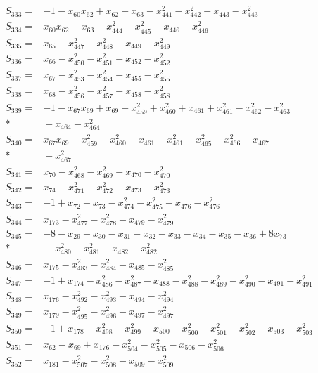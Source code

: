 \begin{align*}
S_{333}={}&-1-x_{60}x_{62}+x_{62}+x_{63}-x_{441}^{2}-x_{442}^{2}-x_{443}-x_{443}^{2}\\[3pt]
S_{334}={}&x_{60}x_{62}-x_{63}-x_{444}^{2}-x_{445}^{2}-x_{446}-x_{446}^{2}\\[3pt]
S_{335}={}&x_{65}-x_{447}^{2}-x_{448}^{2}-x_{449}-x_{449}^{2}\\[3pt]
S_{336}={}&x_{66}-x_{450}^{2}-x_{451}^{2}-x_{452}-x_{452}^{2}\\[3pt]
S_{337}={}&x_{67}-x_{453}^{2}-x_{454}^{2}-x_{455}-x_{455}^{2}\\[3pt]
S_{338}={}&x_{68}-x_{456}^{2}-x_{457}^{2}-x_{458}-x_{458}^{2}\\[3pt]
S_{339}={}&-1-x_{67}x_{69}+x_{69}+x_{459}^{2}+x_{460}^{2}+x_{461}+x_{461}^{2}-x_{462}^{2}-x_{463}^{2}\\*
&{}-x_{464}-x_{464}^{2}\\[3pt]
S_{340}={}&x_{67}x_{69}-x_{459}^{2}-x_{460}^{2}-x_{461}-x_{461}^{2}-x_{465}^{2}-x_{466}^{2}-x_{467}\\*
&{}-x_{467}^{2}\\[3pt]
S_{341}={}&x_{70}-x_{468}^{2}-x_{469}^{2}-x_{470}-x_{470}^{2}\\[3pt]
S_{342}={}&x_{74}-x_{471}^{2}-x_{472}^{2}-x_{473}-x_{473}^{2}\\[3pt]
S_{343}={}&-1+x_{72}-x_{73}-x_{474}^{2}-x_{475}^{2}-x_{476}-x_{476}^{2}\\[3pt]
S_{344}={}&x_{173}-x_{477}^{2}-x_{478}^{2}-x_{479}-x_{479}^{2}\\[3pt]
S_{345}={}&-8-x_{29}-x_{30}-x_{31}-x_{32}-x_{33}-x_{34}-x_{35}-x_{36}+8x_{73}\\*
&{}-x_{480}^{2}-x_{481}^{2}-x_{482}-x_{482}^{2}\\[3pt]
S_{346}={}&x_{175}-x_{483}^{2}-x_{484}^{2}-x_{485}-x_{485}^{2}\\[3pt]
S_{347}={}&-1+x_{174}-x_{486}^{2}-x_{487}^{2}-x_{488}-x_{488}^{2}-x_{489}^{2}-x_{490}^{2}-x_{491}-x_{491}^{2}\\[3pt]
S_{348}={}&x_{176}-x_{492}^{2}-x_{493}^{2}-x_{494}-x_{494}^{2}\\[3pt]
S_{349}={}&x_{179}-x_{495}^{2}-x_{496}^{2}-x_{497}-x_{497}^{2}\\[3pt]
S_{350}={}&-1+x_{178}-x_{498}^{2}-x_{499}^{2}-x_{500}-x_{500}^{2}-x_{501}^{2}-x_{502}^{2}-x_{503}-x_{503}^{2}\\[3pt]
S_{351}={}&x_{62}-x_{69}+x_{176}-x_{504}^{2}-x_{505}^{2}-x_{506}-x_{506}^{2}\\[3pt]
S_{352}={}&x_{181}-x_{507}^{2}-x_{508}^{2}-x_{509}-x_{509}^{2}\\[3pt]

\end{align*}
